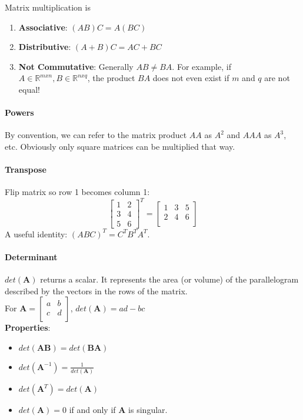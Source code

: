 \documentclass{article}
\begin{document}
Matrix multiplication is
\begin{enumerate}
  \item \textbf{Associative}: $(AB)C = A(BC)$
  \item \textbf{Distributive}: $(A+B)C = AC + BC$
  \item \textbf{Not Commutative}: Generally $AB \neq BA$. For example, if $A\in \mathbb{R}^{mxn}, B \in \mathbb{R}^{nxq}$, the product $BA$ does not even exist if $m$ and $q$ are not equal!
\end{enumerate}

\paragraph{Powers} By convention, we can refer to the matrix product $AA$ as $A^2$ and $AAA$ as $A^3$, etc. Obviously only square matrices can be multiplied that way.

\paragraph{Transpose} Flip matrix so row 1 becomes column 1:
\[
\begin{bmatrix}
    1 & 2 \\
    3 & 4 \\
    5 & 6
\end{bmatrix}^T
=
\begin{bmatrix}
    1 & 3 & 5\\
    2 & 4 & 6\\
\end{bmatrix}
\]
A useful identity: $(ABC)^T = C^TB^TA^T$.

\paragraph{Determinant} $det(\mathbf{A})$ returns a scalar. It represents the area (or volume) of the parallelogram described by the vectors in the rows of the matrix.\\
For $\mathbf{A} = \begin{bmatrix}
    a & b \\
    c & d \\
\end{bmatrix}$, $det(\mathbf{A}) = ad-bc$\\
\textbf{Properties}:
\begin{itemize}
	\item $det(\mathbf{AB}) = det(\mathbf{BA})$
    \item $det(\mathbf{A}^{-1}) = \frac{1}{det(\mathbf{A})}$
    \item $det(\mathbf{A}^T) = det(\mathbf{A})$
    \item $det(\mathbf{A}) = 0$ if and only if \textbf{A} is singular.
\end{itemize}
\end{document}
